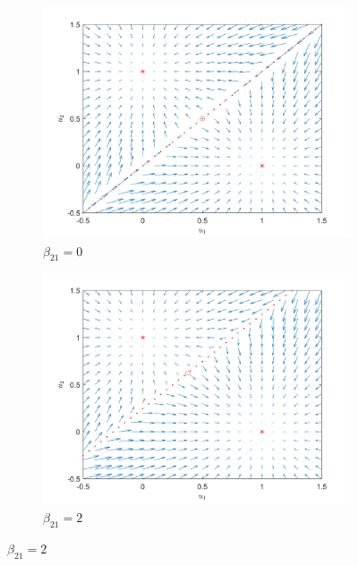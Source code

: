 \iftrue
   \begin{figure}
        \begin{subfigure}[b]{0.475\textwidth}
            \centering
            \includegraphics[width=\textwidth]{text/analysis/fig/2by2monotone/bias_0.png}
            \caption{\small $\beta_{21}=0$}
            \label{fig:mean and std of net14}
        \end{subfigure}
        \hfill
        \begin{subfigure}[b]{0.475\textwidth}  
            \centering 
            \includegraphics[width=\textwidth]{text/analysis/fig/2by2monotone/bias_2.png}
            \caption{$\beta_{21}=2$}
            \label{fig:mean and std of net24}

\end{subfigure}
\end{figure}
